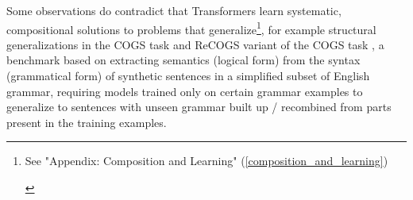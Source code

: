\documentclass[11pt]{article}
\begin{document}
Some observations do contradict that Transformers learn systematic, compositional solutions to problems that generalize\footnote{\begin{footnotesize}See "Appendix: Composition and Learning" (\ref{composition_and_learning})\end{footnotesize}}, for example structural generalizations
in the COGS task and ReCOGS\cite{Wu2023} variant of the COGS task \cite{KimLinzen2020}
, a benchmark based on extracting semantics (logical form) from the syntax (grammatical form) of synthetic sentences in a simplified subset of English grammar, requiring models trained only on certain grammar examples to generalize to sentences with unseen grammar built up / recombined from parts present in the training examples.
\end{document}
